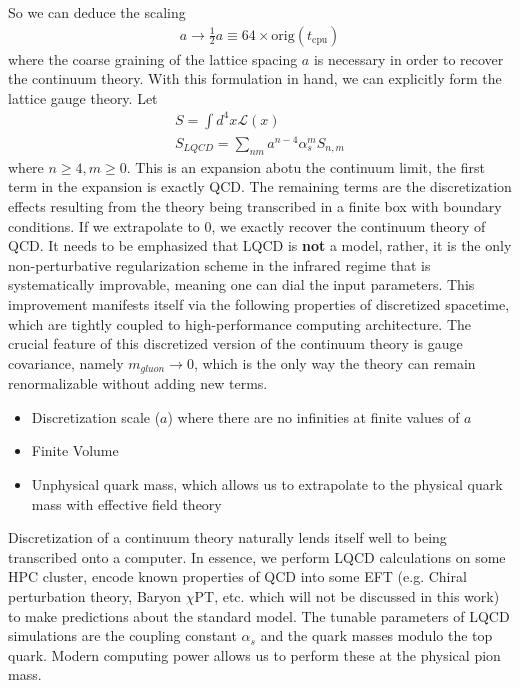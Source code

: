 So we can deduce the scaling 
\begin{align}
    a \rightarrow \frac{1}{2}a \equiv 64 \times \text{orig}(t_{\text{cpu}})
\end{align} 
where the coarse graining of the lattice spacing $a$ is necessary in order to recover the continuum theory. With this formulation in hand, we can explicitly form the lattice gauge theory. 
Let 
\begin{align}
    S = \int d^4x \mathcal{L}(x) \\
    S_{LQCD} = \sum_{nm}^{} a^{n-4}\alpha_s^m S_{n,m} 
\end{align} where $n\geq4,m\geq0$. This is an expansion abotu the continuum limit, the first term in the expansion is exactly QCD. The remaining terms are the discretization effects resulting from the theory being transcribed in a finite box with boundary conditions. If we extrapolate to 0, we exactly recover the continuum theory of QCD. 
It needs to be emphasized that LQCD is \textbf{not} a model, rather, it is the only non-perturbative regularization scheme in the infrared regime that is systematically improvable, meaning one can dial the input parameters. This improvement manifests itself via the following properties of discretized spacetime, which are tightly coupled to high-performance computing architecture. The crucial feature of this discretized version of the continuum theory is gauge covariance, namely $m_{gluon} \rightarrow 0$, which is the only way the theory can remain renormalizable without adding new terms.  
\begin{itemize}
    \item Discretization scale ($a$) where there are no infinities at finite values of $a$
    \item Finite Volume 
    \item Unphysical quark mass, which allows us to extrapolate to the physical quark mass with effective field theory 
\end{itemize}


Discretization of a continuum theory naturally lends itself well to being transcribed onto a computer. In essence, we perform LQCD calculations on some HPC cluster, encode known properties of QCD into some EFT (e.g. Chiral perturbation theory, Baryon $\chi$PT, etc. which will not be discussed in this work) to make predictions about the standard model. The tunable parameters of LQCD simulations are the coupling constant $\alpha_s$ and the quark masses modulo the top quark.  Modern computing power allows us to perform these at the physical pion mass. 
